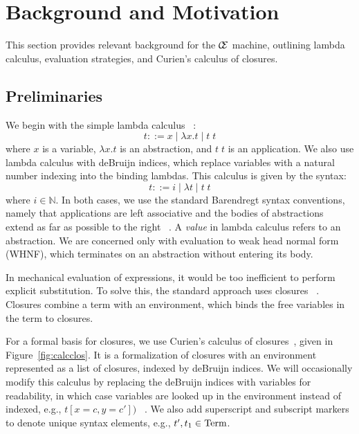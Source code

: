 \section{Background and Motivation} \label{sec:back}

This section provides relevant background for the $\mathcal{\mathcal{C} \mskip -4mu \mathcal{E}}$ machine,
outlining lambda calculus, evaluation strategies, and Curien's calculus of
closures.

\subsection{Preliminaries}

We begin with the simple lambda calculus ~\cite{barendregt1984lambda}:  $$ t::= x
\; | \;  \lambda x.t \; | \;  t \; t $$ where $x$ is a variable, $\lambda x.t$
is an abstraction, and $t \; t$ is an application. We also use lambda calculus
with deBruijn indices, which replace variables with a natural number indexing
into the binding lambdas.  This calculus is given by the syntax: $$ t::= i \; |
\; \lambda t \; | \; t \; t $$ where $i \in \mathbb{N}$. In both cases, we use
the standard Barendregt syntax conventions, namely that applications are left
associative and the bodies of abstractions extend as far as possible to the
right ~\cite{barendregt1984lambda}.  A \emph{value} in lambda calculus refers to
an abstraction. We are concerned only with evaluation to weak head normal form
(WHNF), which terminates on an abstraction without entering its body.

In mechanical evaluation of expressions, it would be too inefficient to perform
explicit substitution. To solve this, the standard approach uses closures
~\cite{landin1964mechanical,curien1991abstract,jonesstg,biernacka2007concrete}.
Closures combine a term with an environment, which binds the free variables in
the term to closures. 

For a formal basis for closures, we use Curien's calculus of
closures~\cite{curien1991abstract}, given in Figure~\ref{fig:calcclos}.  It is a
formalization of closures with an environment represented as a list of closures,
indexed by deBruijn indices. We will occasionally modify this calculus by
replacing the deBruijn indices with variables for readability, in which case
variables are looked up in the environment instead of indexed, e.g., $t[x = c, y
= c'])$ ~\cite{barendregt1984lambda}. We also add superscript and subscript
markers to denote unique syntax elements, e.g., $t', t_1 \in \textnormal{Term}$. 

